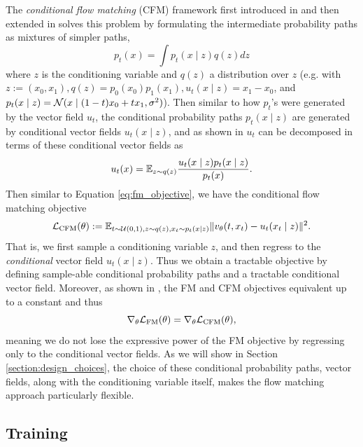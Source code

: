 The \textit{conditional flow matching} (CFM) framework first introduced in \citep{lipmanFlowMatchingGenerative2023} and then extended in \citep{tongImprovingGeneralizingFlowbased2023} solves this problem by formulating the intermediate probability paths as mixtures of simpler paths, 
\begin{equation}
    p_t(x) = \int p_t(x \mid z) q(z) dz
\end{equation}
where $z$ is the conditioning variable and $q(z)$ a distribution over $z$ (e.g. with $z := (x_0, x_1), q(z) = p_0(x_0)p_1(x_1), u_t(x \mid z) = x_1 - x_0$, and $p_t(x \mid z) = \mathcal{N}(x \mid (1-t)x_0 + tx_1, \sigma^2)$). Then similar to how $p_t$'s were generated by the vector field $u_t$, the conditional probability paths $p_t(x \mid z)$ are generated by conditional vector fields $u_t(x \mid z)$, and as shown in \citep{tongImprovingGeneralizingFlowbased2023} $u_t$ can be decomposed in terms of these conditional vector fields as 
\begin{equation}
    u_t(x) = \mathbb{E}_{z \sim q(z)} \frac{u_t(x \mid z) p_t(x \mid z)}{p_t(x)}.
\end{equation}
Then similar to Equation \ref{eq:fm_objective}, we have the conditional flow matching objective 
\begin{equation} \label{eq:cfm_objective}
    \mathcal{L}_{\text{CFM}}(\theta) := \mathbb{E}_{t \sim \mathcal{U}(0,1), z \sim q(z), x_t \sim p_t(x \mid z)}
    \Vert v_\theta(t, x_t) - u_t(x_t \mid z) \Vert ^2.
\end{equation}
That is, we first sample a conditioning variable $z$, and then regress to the \textit{conditional} vector field $u_t(x \mid z)$. Thus we obtain a tractable objective by defining sample-able conditional probability paths and a tractable conditional vector field. Moreover, as shown in \citep{tongImprovingGeneralizingFlowbased2023}, the FM and CFM objectives equivalent up to a constant and thus 
\begin{equation}
    \nabla_\theta \mathcal{L}_{\text{FM}}(\theta) = \nabla_\theta \mathcal{L}_{\text{CFM}}(\theta),
\end{equation}
meaning we do not lose the expressive power of the FM objective by regressing only to the conditional vector fields. As we will show in Section \ref{section:design_choices}, the choice of these conditional probability paths, vector fields, along with the conditioning variable itself, makes the flow matching approach particularly flexible.

\subsection{Training} \label{sec:fm_training}

